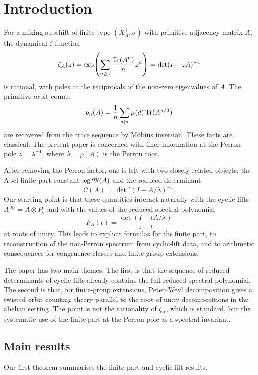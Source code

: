 \section{Introduction}\label{sec:introduction}

For a mixing subshift of finite type $(X_A^+,\sigma)$ with primitive
adjacency matrix $A$, the dynamical $\zeta$-function
\[
  \zeta_A(z)
  =\exp\!\left(\sum_{n\ge 1}\frac{\operatorname{Tr}(A^n)}{n}z^n\right)
  =\det(I-zA)^{-1}
\]
is rational, with poles at the reciprocals of the non-zero eigenvalues
of \(A\). The primitive orbit counts
\[
  p_n(A)=\frac{1}{n}\sum_{d\mid n}\mu(d)\operatorname{Tr}(A^{n/d})
\]
are recovered from the trace sequence by M\"obius inversion. These
facts are classical. The present paper is concerned with finer
information at the Perron pole \(z=\lambda^{-1}\), where
\(\lambda=\rho(A)\) is the Perron root.

After removing the Perron factor, one is left with two closely related
objects: the Abel finite-part constant \(\log\mathfrak{M}(A)\) and the reduced
determinant
\[
  C(A)=\det\nolimits'(I-A/\lambda)^{-1}.
\]
Our starting point is that these quantities interact naturally with the
cyclic lifts \(A^{\langle q\rangle}=A\otimes P_q\) and with the values
of the reduced spectral polynomial
\[
  F_A(t)=\frac{\det(I-tA/\lambda)}{1-t}
\]
at roots of unity. This leads to explicit formulas for the finite part,
to reconstruction of the non-Perron spectrum from cyclic-lift data, and
to arithmetic consequences for congruence classes and finite-group
extensions.

The paper has two main themes. The first is that the sequence of
reduced determinants of cyclic lifts already contains the full reduced
spectral polynomial. The second is that, for finite-group extensions,
Peter--Weyl decomposition gives a twisted orbit-counting theory parallel
to the root-of-unity decompositions in the abelian setting. The point
is not the rationality of \(\zeta_A\), which is standard, but the
systematic use of the finite part at the Perron pole as a spectral
invariant.

\subsection{Main results}

Our first theorem summarises the finite-part and cyclic-lift results.

